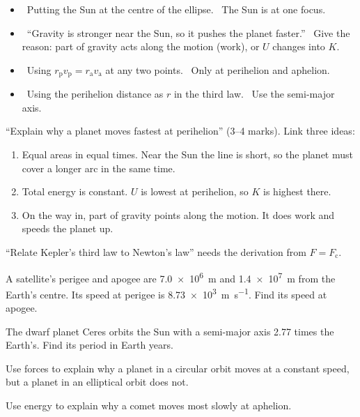 \begin{mistakes}
\begin{itemize}
  \item \xmark\ Putting the Sun at the centre of the ellipse. \cmark\ The Sun is at one focus.
  \item \xmark\ ``Gravity is stronger near the Sun, so it pushes the planet faster.'' \cmark\ Give
        the reason: part of gravity acts along the motion (work), or $U$ changes into $K$.
  \item \xmark\ Using $r_\mathrm{p}v_\mathrm{p} = r_\mathrm{a}v_\mathrm{a}$ at any two points.
        \cmark\ Only at perihelion and aphelion.
  \item \xmark\ Using the perihelion distance as $r$ in the third law. \cmark\ Use the
        semi-major axis.
\end{itemize}
\end{mistakes}

\begin{examtip}
``Explain why a planet moves fastest at perihelion'' (3--4 marks). Link three ideas:
\begin{enumerate}
  \item Equal areas in equal times. Near the Sun the line is short, so the planet must cover a
        longer arc in the same time.
  \item Total energy is constant. $U$ is lowest at perihelion, so $K$ is highest there.
  \item On the way in, part of gravity points along the motion. It does work and speeds the
        planet up.
\end{enumerate}
``Relate Kepler's third law to Newton's law'' needs the derivation from $F = F_\mathrm{c}$.
\end{examtip}

\begin{quickcheck}
  \item A satellite's perigee and apogee are \qty{7.0e6}{m} and \qty{1.4e7}{m} from the Earth's
        centre. Its speed at perigee is \qty{8.73e3}{m.s^{-1}}. Find its speed at apogee.
  \item The dwarf planet Ceres orbits the Sun with a semi-major axis 2.77 times the Earth's. Find
        its period in Earth years.
  \item Use forces to explain why a planet in a circular orbit moves at a constant speed, but a
        planet in an elliptical orbit does not.
  \item Use energy to explain why a comet moves most slowly at aphelion.
\end{quickcheck}

